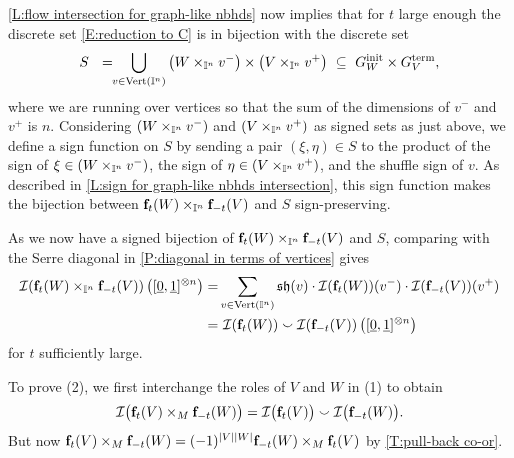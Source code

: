 \cref{L:flow intersection for graph-like nbhds} now implies that for $t$ large enough the discrete set \eqref{E:reduction to C} is in bijection with the discrete set
\begin{equation*}
	S\ \ =\!\! \bigcup_{v \in {\rm Vert}(\mathbb{I}^n)} \left(W \times_{\mathbb{I}^n} v^-\right) \times \left(V \times_{\mathbb{I}^n} v^+\right) \ \subseteq\ G^{\mathrm{init}}_W \times G^{\mathrm{term}}_V,
\end{equation*}
where we are running over vertices so that the sum of the dimensions of $v^-$ and $v^+$ is $n$.
Considering $\left(W \times_{\mathbb{I}^n} v^-\right)$ and $\left(V \times_{\mathbb{I}^n} v^+\right)$ as signed sets as just above, we define a sign function on $S$ by sending a pair $(\xi, \eta) \in S$ to the product of the sign of $\xi \in \left(W \times_{\mathbb{I}^n} v^-\right)$, the sign of $\eta \in \left(V \times_{\mathbb{I}^n} v^+\right)$, and the shuffle sign of $v$.
As described in \cref{L:sign for graph-like nbhds intersection}, this sign function makes the bijection between $\mathbf{f}_t(W) \times_{\mathbb{I}^n} \mathbf{f}_{-t}(V)$ and $S$ sign-preserving.

As we now have a signed bijection of $\mathbf{f}_t(W) \times_{\mathbb{I}^n} \mathbf{f}_{-t}(V)$ and $S$, comparing with the Serre diagonal in \cref{P:diagonal in terms of vertices} gives
\begin{align*}
	\mathcal{I} (\mathbf{f}_t(W) \times_{\mathbb{I}^n} \mathbf{f}_{-t}(V)) \left([\underline{0}, \underline{1}]^{\otimes n}\right) = &
	\sum_{v \in {\rm Vert}(\mathbb{I}^n)} \mathfrak{sh}(v) \cdot \mathcal{I}(\mathbf{f}_t(W))(v^-) \cdot \mathcal{I}(\mathbf{f}_{-t}(V))(v^+) \\ = & \
	\mathcal{I}(\mathbf{f}_t(W)) \smallsmile \mathcal{I}(\mathbf{f}_{-t}(V)) \left([\underline{0}, \underline{1}]^{\otimes n}\right)
\end{align*}
for $t$ sufficiently large.

To prove (2), we first interchange the roles of $V$ and $W$ in (1) to obtain
\begin{equation*}
	\mathcal{I} \big( \mathbf{f}_t(V) \times_M \mathbf{f}_{-t}(W) \big) =
	\mathcal{I} \big( \mathbf{f}_t(V) \big) \smallsmile \mathcal{I} \big( \mathbf{f}_{-t}(W) \big).
\end{equation*}
But now $\mathbf{f}_t(V) \times_M \mathbf{f}_{-t}(W)=(-1)^{|V||W|}\mathbf{f}_{-t}(W) \times_M \mathbf{f}_{t}(V)$ by \cref{T:pull-back co-or}.
\hfill\qedsymbol